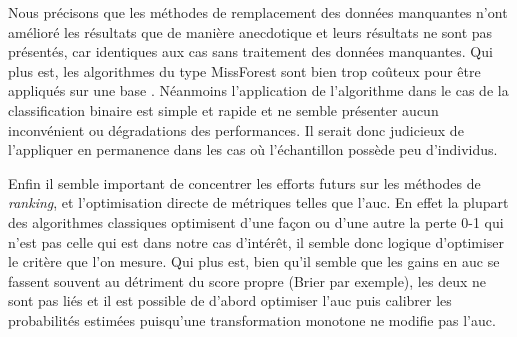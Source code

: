 Nous précisons que les méthodes de remplacement des données manquantes n'ont amélioré les résultats que de manière anecdotique et leurs résultats ne sont pas présentés, car identiques aux cas sans traitement des données manquantes. Qui plus est, les algorithmes du type MissForest sont bien trop coûteux pour être appliqués sur une base . Néanmoins l'application de l'algorithme dans le cas de la classification binaire est simple et rapide et ne semble présenter aucun inconvénient ou dégradations des performances. Il serait donc judicieux de l'appliquer en permanence dans les cas où l'échantillon possède peu d'individus.

Enfin il semble important de concentrer les efforts futurs sur les méthodes de \emph{ranking}, et l'optimisation directe de métriques telles que l'\ac{auc}. En effet la plupart des algorithmes classiques optimisent d'une façon ou d'une autre la perte 0-1 qui n'est pas celle qui est dans notre cas d'intérêt, il semble donc logique d'optimiser le critère que l'on mesure. Qui plus est, bien qu'il semble que les gains en \ac{auc} se fassent souvent au détriment du score propre (Brier par exemple), les deux ne sont pas liés et il est possible de d'abord optimiser l'\ac{auc} puis calibrer les probabilités estimées puisqu'une transformation monotone ne modifie pas l'\ac{auc}.